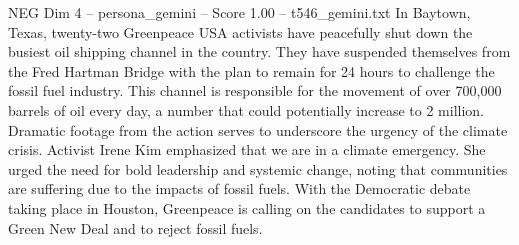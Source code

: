 \begin{textsample}{NEG Dim 4 – persona\_gemini – Score 1.00 – t546\_gemini.txt}  \label{ex:f4_neg_020}
In Baytown, Texas, twenty-two Greenpeace USA activists have peacefully shut down the busiest oil shipping channel in the country.
They have suspended themselves from the Fred Hartman Bridge with the plan to remain for 24 hours to challenge the fossil fuel industry.
This channel is responsible for the movement of over 700,000 barrels of oil every day, a number that could potentially increase to 2 million.
Dramatic footage from the action serves to underscore the urgency of the climate crisis.
Activist Irene Kim emphasized that we are in a climate emergency.
She urged the need for bold leadership and systemic change, noting that communities are suffering due to the impacts of fossil fuels.
With the Democratic debate taking place in Houston, Greenpeace is calling on the candidates to support a Green New Deal and to reject fossil fuels.

\end{textsample}
